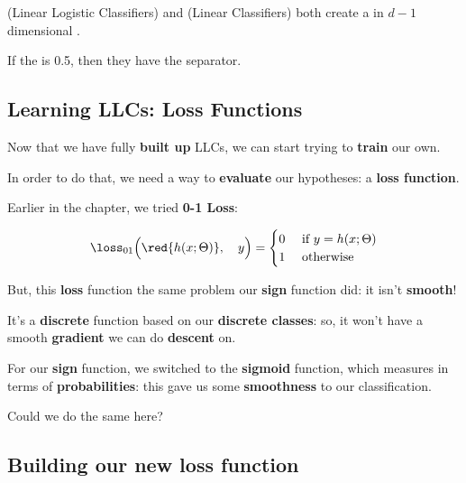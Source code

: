         \begin{concept}
             (Linear Logistic Classifiers) and  (Linear Classifiers) both create a   in $d-1$ dimensional .
            
            If the  is 0.5, then they have the  separator.
        \end{concept}
    
    \subsection{Learning LLCs: Loss Functions}
    
        Now that we have fully \textbf{built up} LLCs, we can start trying to \textbf{train} our own. 
        
        In order to do that, we need a way to \textbf{evaluate} our hypotheses: a \textbf{loss function}.
        
        Earlier in the chapter, we tried \textbf{0-1 Loss}:

        \begin{equation*}
            \loss_{01}
            \Big(  
                \red{h(x; \Theta)} ,\quad  y 
            \Big) 
            =
            \begin{cases}
                0 & \text{ if } y = h(x; \Theta)\\
                1 & \text{ otherwise}
            \end{cases}   
        \end{equation*}
        
        But, this \textbf{loss} function the same problem our \textbf{sign} function did: it isn't \textbf{smooth}! 
        
        It's a \textbf{discrete} function based on our \textbf{discrete classes}: so, it won't have a smooth \textbf{gradient} we can do \textbf{descent} on.
        
        For our \textbf{sign} function, we switched to the \textbf{sigmoid} function, which measures in terms of \textbf{probabilities}: this gave us some \textbf{smoothness} to our classification.
        
        Could we do the same here?
        
    \subsection{Building our new loss function}
    

